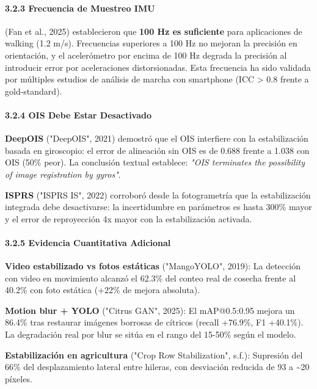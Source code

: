 \paragraph{3.2.3 Frecuencia de Muestreo IMU}


(Fan et al., 2025) establecieron que \textbf{100 Hz es suficiente} para aplicaciones de walking (1.2 m/s). Frecuencias superiores a 100 Hz no mejoran la precisión en orientación, y el acelerómetro por encima de 100 Hz degrada la precisión al introducir error por aceleraciones distorsionadas. Esta frecuencia ha sido validada por múltiples estudios de análisis de marcha con smartphone (ICC > 0.8 frente a gold-standard).


\paragraph{3.2.4 OIS Debe Estar Desactivado}


\textbf{DeepOIS} ("DeepOIS", 2021) demostró que el OIS interfiere con la estabilización basada en giroscopio: el error de alineación sin OIS es de 0.688 frente a 1.038 con OIS (50\% peor). La conclusión textual establece: \textit{"OIS terminates the possibility of image registration by gyros"}.


\textbf{ISPRS} ("ISPRS IS", 2022) corroboró desde la fotogrametría que la estabilización integrada debe desactivarse: la incertidumbre en parámetros es hasta 300\% mayor y el error de reproyección 4x mayor con la estabilización activada.


\paragraph{3.2.5 Evidencia Cuantitativa Adicional}


\textbf{Video estabilizado vs fotos estáticas} ("MangoYOLO", 2019): La detección con video en movimiento alcanzó el 62.3\% del conteo real de cosecha frente al 40.2\% con foto estática (+22\% de mejora absoluta).


\textbf{Motion blur + YOLO} ("Citrus GAN", 2025): El mAP@0.5:0.95 mejora un 86.4\% tras restaurar imágenes borrosas de cítricos (recall +76.9\%, F1 +40.1\%). La degradación real por blur se sitúa en el rango del 15-50\% según el modelo.


\textbf{Estabilización en agricultura} ("Crop Row Stabilization", s.f.): Supresión del 66\% del desplazamiento lateral entre hileras, con desviación reducida de 93 a \textasciitilde{}20 píxeles.


